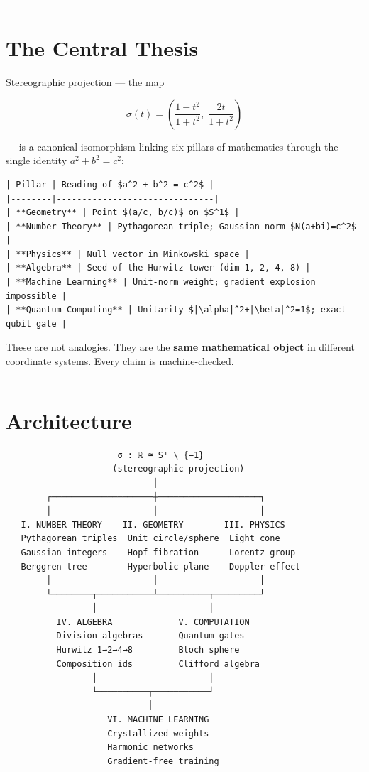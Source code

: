 \documentclass[12pt,a4paper,openany]{book}
\begin{document}
\bigskip\hrule\bigskip

\section{The Central Thesis}

Stereographic projection — the map

$$\sigma(t) = \left(\frac{1-t^2}{1+t^2},\;\frac{2t}{1+t^2}\right)$$

— is a canonical isomorphism linking six pillars of mathematics through the single identity $a^2 + b^2 = c^2$:

\begin{verbatim}
| Pillar | Reading of $a^2 + b^2 = c^2$ |
|--------|-------------------------------|
| **Geometry** | Point $(a/c, b/c)$ on $S^1$ |
| **Number Theory** | Pythagorean triple; Gaussian norm $N(a+bi)=c^2$ |
| **Physics** | Null vector in Minkowski space |
| **Algebra** | Seed of the Hurwitz tower (dim 1, 2, 4, 8) |
| **Machine Learning** | Unit-norm weight; gradient explosion impossible |
| **Quantum Computing** | Unitarity $|\alpha|^2+|\beta|^2=1$; exact qubit gate |
\end{verbatim}

These are not analogies. They are the \textbf{same mathematical object} in different coordinate systems. Every claim is machine-checked.

\bigskip\hrule\bigskip

\section{Architecture}

\begin{verbatim}
                      σ : ℝ ≅ S¹ \ {−1}
                     (stereographic projection)
                             │
        ┌────────────────────┼────────────────────┐
        │                    │                    │
   I. NUMBER THEORY    II. GEOMETRY        III. PHYSICS
   Pythagorean triples  Unit circle/sphere  Light cone
   Gaussian integers    Hopf fibration      Lorentz group
   Berggren tree        Hyperbolic plane    Doppler effect
        │                    │                    │
        └────────┬───────────┴──────────┬─────────┘
                 │                      │
          IV. ALGEBRA             V. COMPUTATION
          Division algebras       Quantum gates
          Hurwitz 1→2→4→8         Bloch sphere
          Composition ids         Clifford algebra
                 │                      │
                 └──────────┬───────────┘
                            │
                    VI. MACHINE LEARNING
                    Crystallized weights
                    Harmonic networks
                    Gradient-free training
\end{verbatim}
\end{document}
